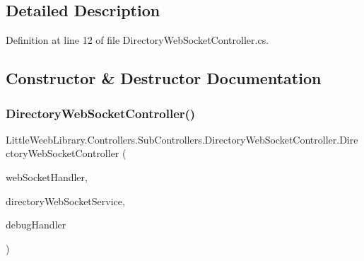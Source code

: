 \subsection{Detailed Description}


Definition at line 12 of file Directory\+Web\+Socket\+Controller.\+cs.



\subsection{Constructor \& Destructor Documentation}
\mbox{\label{class_little_weeb_library_1_1_controllers_1_1_sub_controllers_1_1_directory_web_socket_controller_a46e3ddc55aed91ecf9ecf4e8b6849aa8}} 
\subsubsection{\texorpdfstring{Directory\+Web\+Socket\+Controller()}{DirectoryWebSocketController()}}
{\footnotesize\ttfamily Little\+Weeb\+Library.\+Controllers.\+Sub\+Controllers.\+Directory\+Web\+Socket\+Controller.\+Directory\+Web\+Socket\+Controller (\begin{DoxyParamCaption}\item[{\mbox{\hyperlink{interface_little_weeb_library_1_1_handlers_1_1_i_web_socket_handler}{I\+Web\+Socket\+Handler}}}]{web\+Socket\+Handler,  }\item[{\mbox{\hyperlink{interface_little_weeb_library_1_1_services_1_1_i_directory_web_socket_service}{I\+Directory\+Web\+Socket\+Service}}}]{directory\+Web\+Socket\+Service,  }\item[{\mbox{\hyperlink{interface_little_weeb_library_1_1_handlers_1_1_i_debug_handler}{I\+Debug\+Handler}}}]{debug\+Handler }\end{DoxyParamCaption})}



